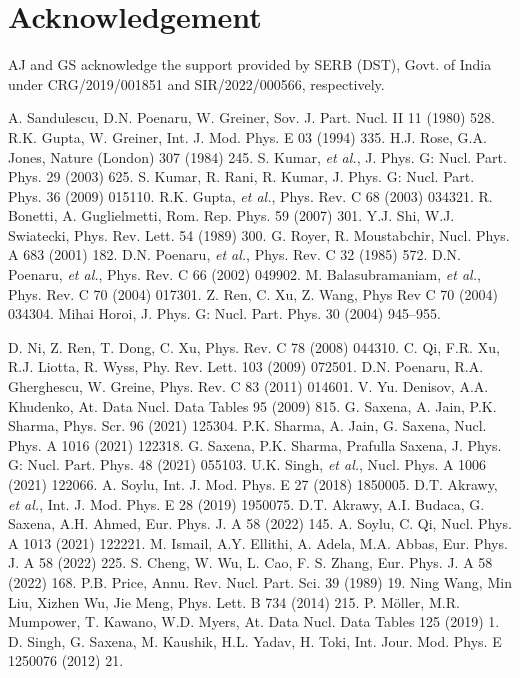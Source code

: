 \documentclass[preprint,10pt]{elsarticle}
\begin{document}
\section{Acknowledgement}
AJ and GS acknowledge the support provided by SERB (DST), Govt. of India under CRG/2019/001851 and SIR/2022/000566, respectively.
\begin{thebibliography}{00}
 A. Sandulescu, D.N. Poenaru, W. Greiner, Sov. J. Part. Nucl. II 11 (1980) 528.
 R.K. Gupta, W. Greiner, Int. J. Mod. Phys. E 03 (1994) 335.
 H.J. Rose, G.A. Jones, Nature (London) 307 (1984) 245.
 S. Kumar, \textit{et al.}, J. Phys. G: Nucl. Part. Phys. 29 (2003) 625.
 S. Kumar, R. Rani, R. Kumar, J. Phys. G: Nucl. Part. Phys. 36 (2009) 015110.
 R.K. Gupta, \textit{et al.}, Phys. Rev. C 68 (2003) 034321.
 R. Bonetti, A. Guglielmetti, Rom. Rep. Phys. 59 (2007) 301.
 Y.J. Shi, W.J. Swiatecki, Phys. Rev. Lett. 54 (1989) 300.
 G. Royer, R. Moustabchir, Nucl. Phys. A 683 (2001) 182.
 D.N. Poenaru, \textit{et al.}, Phys. Rev. C 32 (1985) 572.
 D.N. Poenaru, \textit{et al.}, Phys. Rev. C 66 (2002) 049902.
 M. Balasubramaniam, \textit{et al.}, Phys. Rev. C 70 (2004) 017301.
 Z. Ren, C. Xu, Z. Wang, Phys Rev C 70 (2004) 034304.
 Mihai Horoi, J. Phys. G: Nucl. Part. Phys. 30 (2004) 945–955.

 D. Ni, Z. Ren, T. Dong, C. Xu, Phys. Rev. C 78 (2008) 044310.
 C. Qi, F.R. Xu, R.J. Liotta, R. Wyss, Phy. Rev. Lett. 103 (2009) 072501.
 D.N. Poenaru, R.A. Gherghescu, W. Greine, Phys. Rev. C 83 (2011) 014601.
 V. Yu. Denisov, A.A. Khudenko, At. Data Nucl. Data Tables 95 (2009) 815.
 G. Saxena, A. Jain, P.K. Sharma, Phys. Scr. 96 (2021) 125304.
  P.K. Sharma, A. Jain, G. Saxena, Nucl. Phys. A 1016 (2021) 122318.
 G. Saxena, P.K. Sharma, Prafulla Saxena, J. Phys. G: Nucl. Part. Phys. 48 (2021) 055103.
 U.K. Singh, \textit{et al.}, Nucl. Phys. A 1006 (2021) 122066.
 A. Soylu, Int. J. Mod. Phys. E 27 (2018) 1850005.
 D.T. Akrawy, \textit{et al.}, Int. J. Mod. Phys. E 28 (2019) 1950075.
 D.T. Akrawy, A.I. Budaca, G. Saxena, A.H. Ahmed, Eur. Phys. J. A 58 (2022) 145.
 A. Soylu, C. Qi, Nucl. Phys. A 1013 (2021) 122221.
 M. Ismail, A.Y. Ellithi, A. Adela, M.A. Abbas, Eur. Phys. J. A 58 (2022) 225.
 S. Cheng, W. Wu, L. Cao, F. S. Zhang, Eur. Phys. J. A 58  (2022) 168.
 P.B. Price, Annu. Rev. Nucl. Part. Sci. 39 (1989) 19.
 Ning Wang, Min Liu, Xizhen Wu, Jie Meng, Phys. Lett. B 734 (2014) 215.
 P. M\"{o}ller, M.R. Mumpower, T. Kawano, W.D. Myers, At. Data Nucl. Data Tables 125 (2019) 1.
 D. Singh, G. Saxena, M. Kaushik, H.L. Yadav, H. Toki, Int. Jour. Mod. Phys. E 1250076 (2012) 21.


\end{thebibliography}
\end{document}
